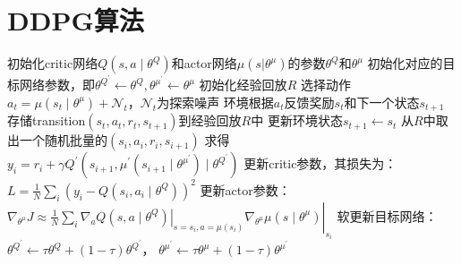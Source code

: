 \documentclass[11pt]{ctexart}
\begin{document}
\section{DDPG算法}
\begin{algorithm}[H] %
	\renewcommand{\thealgorithm}{} %
	\caption{} 
	\begin{algorithmic}[1] %
		\STATE 初始化critic网络$Q\left(s, a \mid \theta^Q\right)$和actor网络$\mu(s|\theta^{\mu})$的参数$\theta^Q$和$\theta^{\mu}$
		\STATE 初始化对应的目标网络参数，即$\theta^{Q^{\prime}} \leftarrow \theta^Q, \theta^{\mu^{\prime}} \leftarrow \theta^\mu$
		\STATE 初始化经验回放$R$
			\STATE 选择动作$a_t=\mu\left(s_t \mid \theta^\mu\right)+\mathcal{N}_t$，$\mathcal{N}_t$为探索噪声
			\STATE 环境根据$a_t$反馈奖励$s_t$和下一个状态$s_{t+1}$
			\STATE 存储transition$(s_t,a_t,r_t,s_{t+1})$到经验回放$R$中
			\STATE 更新环境状态$s_{t+1} \leftarrow s_t$
			\STATE 从$R$中取出一个随机批量的$(s_i,a_i,r_i,s_{i+1})$
			\STATE 求得$y_i=r_i+\gamma Q^{\prime}\left(s_{i+1}, \mu^{\prime}\left(s_{i+1} \mid \theta^{\mu^{\prime}}\right) \mid \theta^{Q^{\prime}}\right)$
			\STATE 更新critic参数，其损失为：$L=\frac{1}{N} \sum_i\left(y_i-Q\left(s_i, a_i \mid \theta^Q\right)\right)^2$
			\STATE 更新actor参数：$\left.\left.\nabla_{\theta^\mu} J \approx \frac{1}{N} \sum_i \nabla_a Q\left(s, a \mid \theta^Q\right)\right|_{s=s_i, a=\mu\left(s_i\right)} \nabla_{\theta^\mu} \mu\left(s \mid \theta^\mu\right)\right|_{s_i}$
			\STATE 软更新目标网络：$\theta^{Q^{\prime}} \leftarrow \tau \theta^Q+(1-\tau) \theta^{Q^{\prime}}$，
			$\theta^{\mu^{\prime}} \leftarrow \tau \theta^\mu+(1-\tau) \theta^{\mu^{\prime}}$
		\ENDFOR
	\end{algorithmic}
\end{algorithm}
\clearpage
\end{document}

